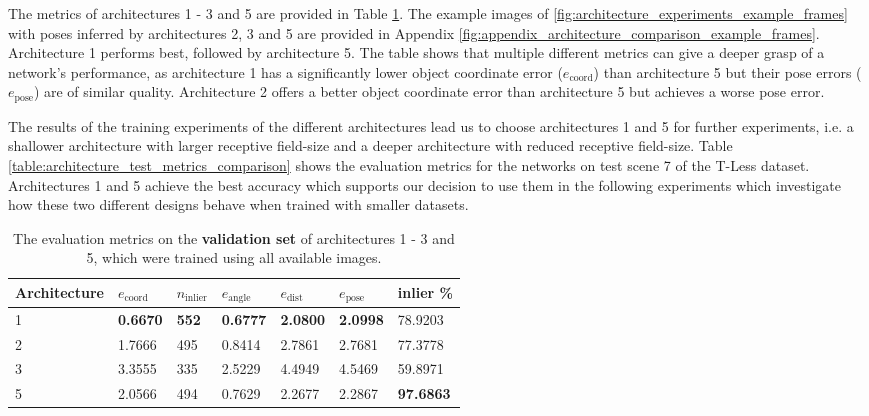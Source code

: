 The metrics of architectures 1 - 3 and 5 are provided in Table \ref{table:architecture_validation_metrics_comparison}. The example images of \fig \ref{fig:architecture_experiments_example_frames} with poses inferred by architectures 2, 3 and 5 are provided in Appendix \ref{fig:appendix_architecture_comparison_example_frames}. Architecture 1 performs best, followed by architecture 5. The table shows that multiple different metrics can give a deeper grasp of a network's performance, as architecture 1 has a significantly lower object coordinate error ($e_{\text{coord}}$) than architecture 5 but their pose errors ($e_{\text{pose}}$) are of similar quality. Architecture 2 offers a better object coordinate error than architecture 5 but achieves a worse pose error.

The results of the training experiments of the different architectures lead us to choose architectures 1 and 5 for further experiments, i.e. a shallower architecture with larger receptive field-size and a deeper architecture with reduced receptive field-size. Table \ref{table:architecture_test_metrics_comparison} shows the evaluation metrics for the networks on test scene 7 of the T-Less dataset. Architectures 1 and 5 achieve the best accuracy which supports our decision to use them in the following experiments which investigate how these two different designs behave when trained with smaller datasets.

\begin{table}[]
\centering
\begin{tabular}{|l||llllll|} \hline
Architecture & $e_{\text{coord}}$ & $n_{\text{inlier}}$ & $e_{\text{angle}}$ & $e_{\text{dist}}$ & $e_{\text{pose}}$ & inlier \% \\ \hline \hline \rowcolor{Gray}
1            & \textbf{0.6670}             & \textbf{552}                 & \textbf{0.6777}             & \textbf{2.0800}           & \textbf{2.0998} & 78.9203  \\ \hline
2            & 1.7666             & 495                 & 0.8414             & 2.7861            & 2.7681  & 77.3778       \\ \hline \rowcolor{Gray}
3            & 3.3555             & 335                 & 2.5229             & 4.4949            & 4.5469    & 59.8971        \\ \hline
5            & 2.0566             & 494                 & 0.7629             & 2.2677            & 2.2867 & \textbf{97.6863} \\ \hline       
\end{tabular}
\caption{The evaluation metrics on the \textbf{validation set} of architectures 1 - 3 and 5, which were trained using all available images.}
\label{table:architecture_validation_metrics_comparison}
\end{table}

